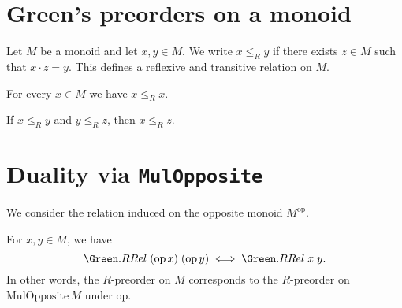 %
\section{Green's preorders on a monoid}

\begin{definition}
\label{def:RRel}
Let \(M\) be a monoid and let \(x,y\in M\).  We write \(x \le_R y\) if there exists \(z\in M\)
such that \(x\cdot z = y\).  This defines a reflexive and transitive relation on \(M\).
\leanok
\end{definition}

\begin{lemma}[Reflexivity of \(\le_R\)]
\label{lem:RRel-refl}
For every \(x\in M\) we have \(x \le_R x\).
\leanok
{}
\end{lemma}

\begin{lemma}[Transitivity of \(\le_R\)]
\label{lem:RRel-trans}
If \(x \le_R y\) and \(y \le_R z\), then \(x \le_R z\).
\leanok
{}
\end{lemma}

\section{Duality via \texttt{MulOpposite}}

We consider the relation induced on the opposite monoid \(M^{\mathrm{op}}\).

\begin{lemma}
\label{lem:RRel-op-iff}
For \(x,y\in M\), we have
\[
  \Green.RRel\;(\mathrm{op}\, x)\;(\mathrm{op}\, y)
  \iff \Green.RRel\;x\;y.
\]
In other words, the \(R\)-preorder on \(M\) corresponds to the \(R\)-preorder on 
\(\mathrm{MulOpposite}\,M\) under \(\mathrm{op}\).
\leanok
{}
\end{lemma}
